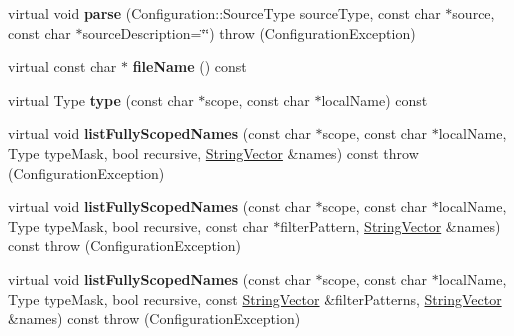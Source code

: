 \begin{DoxyCompactItemize}
\item 
\hypertarget{classCONFIG4CPP__NAMESPACE_1_1ConfigurationImpl_ad93978e0b1013b181380c9e22947d54f}{virtual void {\bfseries parse} (Configuration\-::\-Source\-Type source\-Type, const char $\ast$source, const char $\ast$source\-Description=\char`\"{}\char`\"{})  throw (\-Configuration\-Exception)}\label{classCONFIG4CPP__NAMESPACE_1_1ConfigurationImpl_ad93978e0b1013b181380c9e22947d54f}

\item 
\hypertarget{classCONFIG4CPP__NAMESPACE_1_1ConfigurationImpl_ac39e0c0a64c5f79a0b29af764595e3fc}{virtual const char $\ast$ {\bfseries file\-Name} () const }\label{classCONFIG4CPP__NAMESPACE_1_1ConfigurationImpl_ac39e0c0a64c5f79a0b29af764595e3fc}

\item 
\hypertarget{classCONFIG4CPP__NAMESPACE_1_1ConfigurationImpl_a1280cad50a7164d0ed53822f6110e7c8}{virtual Type {\bfseries type} (const char $\ast$scope, const char $\ast$local\-Name) const }\label{classCONFIG4CPP__NAMESPACE_1_1ConfigurationImpl_a1280cad50a7164d0ed53822f6110e7c8}

\item 
\hypertarget{classCONFIG4CPP__NAMESPACE_1_1ConfigurationImpl_aef9abe659ffe8985e987b2ec78890059}{virtual void {\bfseries list\-Fully\-Scoped\-Names} (const char $\ast$scope, const char $\ast$local\-Name, Type type\-Mask, bool recursive, \hyperlink{classCONFIG4CPP__NAMESPACE_1_1StringVector}{String\-Vector} \&names) const   throw (\-Configuration\-Exception)}\label{classCONFIG4CPP__NAMESPACE_1_1ConfigurationImpl_aef9abe659ffe8985e987b2ec78890059}

\item 
\hypertarget{classCONFIG4CPP__NAMESPACE_1_1ConfigurationImpl_a7414a94c5bc92fc280e75a6af9fe3535}{virtual void {\bfseries list\-Fully\-Scoped\-Names} (const char $\ast$scope, const char $\ast$local\-Name, Type type\-Mask, bool recursive, const char $\ast$filter\-Pattern, \hyperlink{classCONFIG4CPP__NAMESPACE_1_1StringVector}{String\-Vector} \&names) const   throw (\-Configuration\-Exception)}\label{classCONFIG4CPP__NAMESPACE_1_1ConfigurationImpl_a7414a94c5bc92fc280e75a6af9fe3535}

\item 
\hypertarget{classCONFIG4CPP__NAMESPACE_1_1ConfigurationImpl_ac84bf4827fde0aa7a23d0d15052247ae}{virtual void {\bfseries list\-Fully\-Scoped\-Names} (const char $\ast$scope, const char $\ast$local\-Name, Type type\-Mask, bool recursive, const \hyperlink{classCONFIG4CPP__NAMESPACE_1_1StringVector}{String\-Vector} \&filter\-Patterns, \hyperlink{classCONFIG4CPP__NAMESPACE_1_1StringVector}{String\-Vector} \&names) const   throw (\-Configuration\-Exception)}\label{classCONFIG4CPP__NAMESPACE_1_1ConfigurationImpl_ac84bf4827fde0aa7a23d0d15052247ae}


\end{DoxyCompactItemize}
